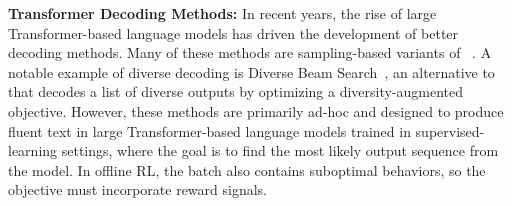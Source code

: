 \textbf{Transformer Decoding Methods:}
In recent years, the rise of large Transformer-based language models has driven the development of better decoding methods. Many of these methods are sampling-based variants of \bs~\cite{r:15,r:16}. 
A notable example of diverse decoding is Diverse Beam Search~\cite{r:136}, an alternative to \bs{} that decodes a list of diverse outputs by optimizing a diversity-augmented objective. However, these methods are primarily ad-hoc and designed to produce fluent text in large Transformer-based language models trained in supervised-learning settings, where the goal is to find the most likely output sequence from the model. In offline RL, the batch also contains suboptimal behaviors, so the objective must incorporate reward signals.
